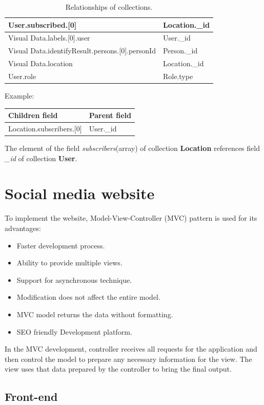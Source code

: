 \begin{table}[H]
\begin{tabular}{|l|l|}
		User.subscribed.{[}0{]}                             & Location.\_id         \\ \hline
		Visual Data.labels.{[}0{]}.user                     & User.\_id             \\ \hline
		Visual Data.identifyResult.persons.{[}0{]}.personId & Person.\_id           \\ \hline
		Visual Data.location                                & Location.\_id         \\ \hline
		User.role                                           & Role.type             \\ \hline
	\end{tabular}
	\caption{Relationships of collections.}
\end{table}
\cleardoublepage
Example:
\begin{table}[H]
	\begin{tabular}{|l|l|}
		\hline
		Children field               & Parent field \\ \hline
		Location.subscribers.{[}0{]} & User.\_id    \\ \hline
	\end{tabular}
\end{table}
The element of the field \textit{subscribers}(array) of collection \textbf{Location} references field \textit{\_id} of collection \textbf{User}.
\section{Social media website}
To implement the website, Model-View-Controller (MVC) pattern is used for its advantages:
\begin{itemize}
\item Faster development process.
\item Ability to provide multiple views.
\item Support for asynchronous technique.
\item Modification does not affect the entire model.
\item MVC model returns the data without formatting.
\item SEO friendly Development platform.
\end{itemize}
In the MVC development, controller receives all requests for the application and then control the model to prepare any necessary information for the view. The view uses that data prepared by the controller to bring the final output.
\subsection{Front-end}
